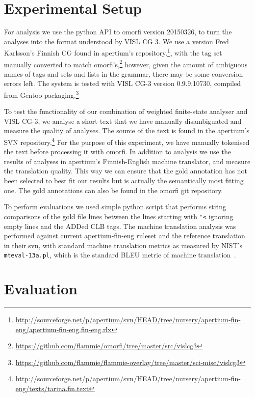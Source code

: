 \documentclass[11pt]{article}
\begin{document}
\section{Experimental Setup}
\label{sec:experimental-setup}

For analysis we use the python API to omorfi version 20150326, to turn the
analyses into the format understood by VISL CG 3. We use a version Fred
Karlsson's Finnish CG found in apertium's
repository.\footnote{\url{http://sourceforge.net/p/apertium/svn/HEAD/tree/nursery/apertium-fin-eng/apertium-fin-eng.fin-eng.rlx}},
with the tag set manually converted to match
omorfi's,\footnote{\url{https://github.com/flammie/omorfi/tree/master/src/vislcg3}}
however, given the amount of ambiguous names of tags and sets and lists in the
grammar, there may be some conversion errors left.  The system is tested with
VISL CG-3 version 0.9.9.10730, compiled from Gentoo
packaging.\footnote{\url{https://github.com/flammie/flammie-overlay/tree/master/sci-misc/vislcg3}}

To test the functionality of our combination of weighted
finite-state analyser and VISL CG-3, we analyse a short text that we have
manually disambiguated and measure the quality of analyses. The source of the
text is found in the apertium's SVN
repository.\footnote{\url{http://sourceforge.net/p/apertium/svn/HEAD/tree/nursery/apertium-fin-eng/texts/tarina.fin.text}}
For the purpose of this experiment, we have manually tokenised the text
before processing it with omorfi.
In addition to analysis we use the results of analyses in apertium's
Finnish-English machine translator, and measure the translation quality. This
way we can ensure that the gold annotation has not been selected to best fit
our results but is actually the semantically most fitting one. The gold
annotations can also be found in the omorfi git repository.

To perform evaluations we used simple python script that performs string
comparisons of the gold file lines between the lines starting with
\texttt{"<} ignoring empty lines and the ADDed CLB tags. The machine
translation analysis was performed against current apertium-fin-eng ruleset
and the reference translation in their svn, with standard machine translation
metrics as measured by NIST's \texttt{mteval-13a.pl}, which is the standard
BLEU metric of machine translation~\cite{bleu}.

\section{Evaluation}
\label{sec:evaluation}
\end{document}
